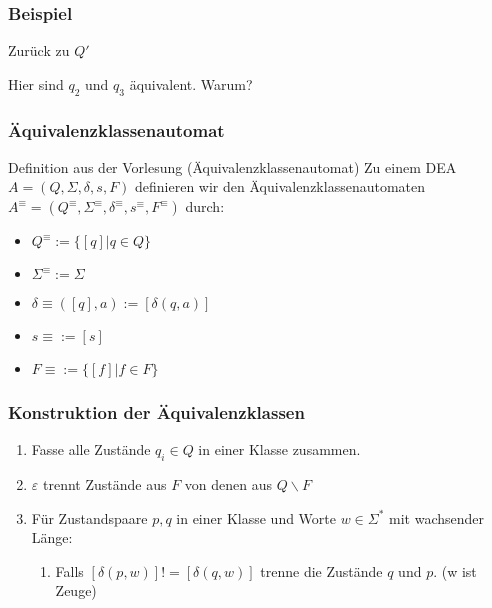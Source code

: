 \documentclass{beamer}
\begin{document}
{\begin{frame}
 \frametitle{Beispiel}
 \begin{block}{Zurück zu $Q'$}
 \begin{figure}[h]
\begin{center}
\end{center}
\end{figure}
Hier sind $q_2$ und $q_3$ äquivalent. Warum?
\end{block}
\end{frame}
\begin{frame}
 \frametitle{Äquivalenzklassenautomat}
 \begin{block}{Definition aus der Vorlesung (Äquivalenzklassenautomat)}
  Zu einem DEA \(A = (Q, \Sigma, \delta, s, F)\) definieren wir den Äquivalenzklassenautomaten 
  \(A^\equiv = (Q^\equiv, \Sigma^\equiv, \delta^\equiv, s^\equiv, F^\equiv)\) durch:
  \begin{itemize}
   \item $Q^\equiv := \{[q]|q\in Q\}$
   \item $\Sigma^\equiv := \Sigma$
   \item $\delta\equiv([q], a) := [\delta(q, a)]$
   \item $s\equiv := [s]$
   \item $F\equiv:= \{[f]|f\in F\}$
  \end{itemize}
 \end{block}
\end{frame}
\begin{frame}
 \frametitle{Konstruktion der Äquivalenzklassen}
 \begin{block}{}
  \begin{enumerate}
   \item Fasse alle Zustände $q_i \in Q$ in einer Klasse zusammen.
   \item $\varepsilon$ trennt Zustände aus $F$ von denen aus $Q \backslash F$
   \item Für Zustandspaare $p, q$ in einer Klasse und
   Worte $w\in \Sigma^*$ mit wachsender Länge: 
    \begin{enumerate}
    \item Falls $[\delta(p, w)] != [\delta(q, w)]$ trenne die Zustände $q$ und $p$. (w ist Zeuge)

\end{enumerate}
\end{enumerate}
\end{block}
\end{frame}}
\end{document}
